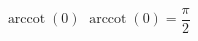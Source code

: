  {$\operatorname{arccot} \left( 0 \right)$ }
{ $\operatorname{arccot} \left( 0 \right) = \dfrac{\pi}{2}$ }
